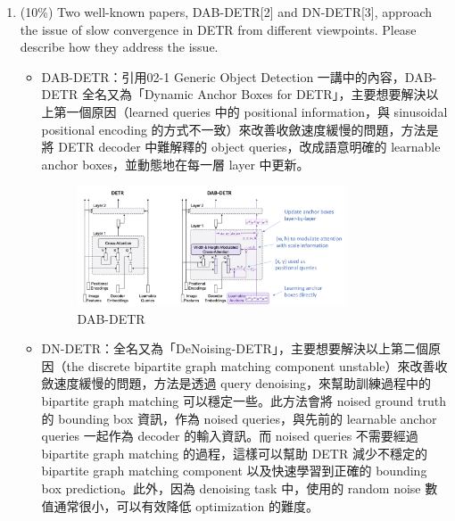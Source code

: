 \documentclass[10pt,a4paper]{article}
\begin{document}
\begin{enumerate}
\item (10\%) Two well-known papers, DAB-DETR[2] and DN-DETR[3], approach the issue of slow convergence in DETR from different viewpoints. Please describe how they address the issue.
\begin{itemize}
\item DAB-DETR：引用02-1 Generic Object Detection 一講中的內容，DAB-DETR 全名又為「Dynamic Anchor Boxes for DETR」，主要想要解決以上第一個原因（learned queries 中的 positional information，與 sinusoidal positional encoding 的方式不一致）來改善收斂速度緩慢的問題，方法是將 DETR decoder 中難解釋的 object queries，改成語意明確的 learnable anchor boxes，並動態地在每一層 layer 中更新。
\begin{figure}[hbt]
\centering
\includegraphics[width=0.8\textwidth]{DAB_DETR.png}
\caption{DAB-DETR}
\label{fig:DAB-DETR}
\end{figure}
\item DN-DETR：全名又為「DeNoising-DETR」，主要想要解決以上第二個原因（the discrete bipartite graph matching component unstable）來改善收斂速度緩慢的問題，方法是透過 query denoising，來幫助訓練過程中的 bipartite graph matching 可以穩定一些。此方法會將 noised ground truth 的 bounding box 資訊，作為 noised queries，與先前的 learnable anchor queries 一起作為 decoder 的輸入資訊。而 noised queries 不需要經過 bipartite graph matching 的過程，這樣可以幫助 DETR 減少不穩定的 bipartite graph matching component 以及快速學習到正確的 bounding box prediction。此外，因為 denoising task 中，使用的 random noise 數值通常很小，可以有效降低 optimization 的難度。


\end{itemize}
\end{enumerate}
\end{document}
